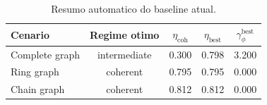 \begin{table}[t]
\centering
\caption{Resumo automatico do baseline atual.}
\begin{tabular}{lcccc}
\toprule
Cenario & Regime otimo & $\eta_{\mathrm{coh}}$ & $\eta_{\mathrm{best}}$ & $\gamma_{\phi}^{\mathrm{best}}$ \\
\midrule
Complete graph & intermediate & 0.300 & 0.798 & 3.200 \\
Ring graph & coherent & 0.795 & 0.795 & 0.000 \\
Chain graph & coherent & 0.812 & 0.812 & 0.000 \\
\bottomrule
\end{tabular}
\end{table}

